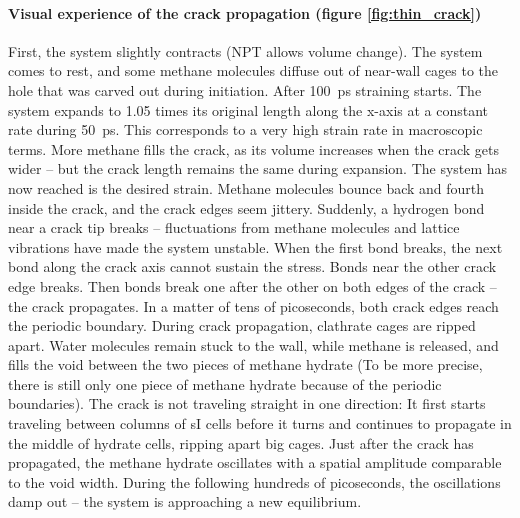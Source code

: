 \begin{framed}
\paragraph{Visual experience of the crack propagation (figure \ref{fig:thin_crack})}
First, the system slightly contracts (NPT allows volume change). The system comes to rest, and some methane molecules diffuse out of near-wall cages to the hole that was carved out during initiation. After \SI{100}{\pico\second} straining starts. The system expands to 1.05 times its original length along the x-axis at a constant rate during \SI{50}{\pico\second}. This corresponds to a very high strain rate in macroscopic terms. More methane fills the crack, as its volume increases when the crack gets wider -- but the crack length remains the same during expansion. The system has now reached is the desired strain. Methane molecules bounce back and fourth inside the crack, and the crack edges seem jittery. Suddenly, a hydrogen bond near a crack tip breaks -- fluctuations from methane molecules and lattice vibrations have made the system unstable. When the first bond breaks, the next bond along the crack axis cannot sustain the stress. Bonds near the other crack edge breaks. Then bonds break one after the other on both edges of the crack -- the crack propagates. In a matter of tens of picoseconds, both crack edges reach the periodic boundary. During crack propagation, clathrate cages are ripped apart. Water molecules remain stuck to the wall, while methane is released, and fills the void between the two pieces of methane hydrate (To be more precise, there is still only one piece of methane hydrate because of the periodic boundaries). The crack is not traveling straight in one direction: It first starts traveling between columns of sI cells before it turns and continues to propagate in the middle of hydrate cells, ripping apart big cages. Just after the crack has propagated, the methane hydrate oscillates with a spatial amplitude comparable to the void width. During the following hundreds of picoseconds, the oscillations damp out -- the system is approaching a new equilibrium.
\end{framed}

